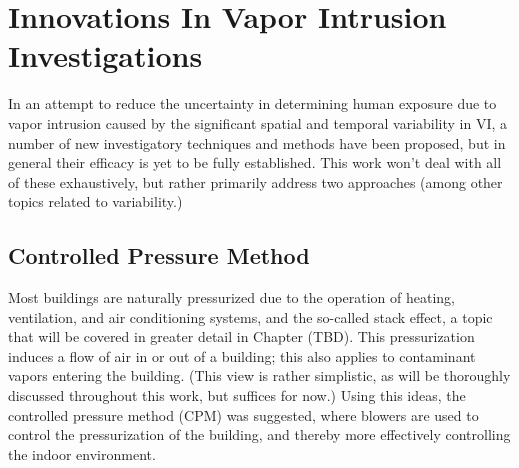 \begin{comment}
Present some ideas that have been put forward to dealing with VI variability.

Cover:
- CPM
- Other techniques?
- Use of ITSs to sample during periods of elevated VI potential

The key point to make that these approaches have something in common: that they either seek to manipulate or utilize some external variable for a desired result.

CPM obviously seeks to artificially manipulate the building pressurization to control contaminant entry rate.
ITS can be variables other than pressure, but it is a key one, and these are used to plan investigations so that higher contaminant concentrations are more likely to be found.

Again, give a few examples from literature and describe what went on.

\end{comment}

\section{Innovations In Vapor Intrusion Investigations}

In an attempt to reduce the uncertainty in determining human exposure due to vapor intrusion caused by the significant spatial and temporal variability in VI, a number of new investigatory techniques and methods have been proposed, but in general their efficacy is yet to be fully established\cite{mchugh_recent_2017}.
This work won't deal with all of these exhaustively, but rather primarily address two approaches (among other topics related to variability.)\par

\subsection{Controlled Pressure Method}

Most buildings are naturally pressurized due to the operation of heating, ventilation, and air conditioning systems, and the so-called stack effect, a topic that will be covered in greater detail in Chapter (TBD). %
This pressurization induces a flow of air in or out of a building; this also applies to contaminant vapors entering the building.
(This view is rather simplistic, as will be thoroughly discussed throughout this work, but suffices for now.)
Using this ideas, the controlled pressure method (CPM) was suggested, where blowers are used to control the pressurization of the building, and thereby more effectively controlling the indoor environment.\par

